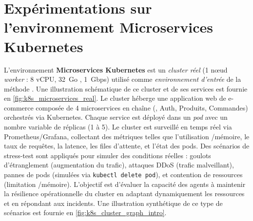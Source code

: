 \section{Expérimentations sur l'environnement Microservices Kubernetes}


L'environnement \textbf{Microservices Kubernetes} est un \emph{cluster réel} (1 nœud \textit{worker} : 8 vCPU, 32~Go , 1~Gbps) utilisé comme \emph{environnement d'entrée} de la méthode . Une illustration schématique de ce cluster et de ses services est fournie en \autoref{fig:k8s_microservices_real}. Le cluster héberge une application web de e-commerce composée de 4 microservices en chaîne (, Auth, Produits, Commandes) orchestrés via Kubernetes. Chaque service est déployé dans un \emph{pod} avec un nombre variable de réplicas (1 à 5). Le cluster est surveillé en temps réel via Prometheus/Grafana, collectant des métriques telles que l'utilisation /mémoire, le taux de requêtes, la latence, les files d'attente, et l'état des pods. Des scénarios de stress-test sont appliqués pour simuler des conditions réelles : goulots d'étranglement (augmentation du trafic), attaques DDoS (trafic malveillant), pannes de pods (simulées via \texttt{kubectl delete pod}), et contention de ressources (limitation /mémoire). L'objectif est d'évaluer la capacité des agents à maintenir la résilience opérationnelle du cluster en adaptant dynamiquement les ressources et en répondant aux incidents. Une illustration synthétique de ce type de scénarios est fournie en \autoref{fig:k8s_cluster_graph_intro}.

